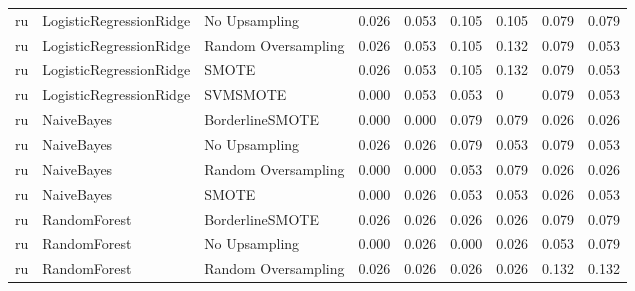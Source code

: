 \begin{tabular}{lllllllll}
      ru &      LogisticRegressionRidge &       No Upsampling & 0.026 &                     0.053 &                 0.105 &                  0.105 &                                   0.079 &     0.079 \\
      ru &      LogisticRegressionRidge & Random Oversampling & 0.026 &                     0.053 &                 0.105 &                  0.132 &                                   0.079 &     0.053 \\
      ru &      LogisticRegressionRidge &               SMOTE & 0.026 &                     0.053 &                 0.105 &                  0.132 &                                   0.079 &     0.053 \\
      ru &      LogisticRegressionRidge &            SVMSMOTE & 0.000 &                     0.053 &                 0.053 &                      0 &                                   0.079 &     0.053 \\
      ru &                   NaiveBayes &     BorderlineSMOTE & 0.000 &                     0.000 &                 0.079 &                  0.079 &                                   0.026 &     0.026 \\
      ru &                   NaiveBayes &       No Upsampling & 0.026 &                     0.026 &                 0.079 &                  0.053 &                                   0.079 &     0.053 \\
      ru &                   NaiveBayes & Random Oversampling & 0.000 &                     0.000 &                 0.053 &                  0.079 &                                   0.026 &     0.026 \\
      ru &                   NaiveBayes &               SMOTE & 0.000 &                     0.026 &                 0.053 &                  0.053 &                                   0.026 &     0.053 \\
      ru &                 RandomForest &     BorderlineSMOTE & 0.026 &                     0.026 &                 0.026 &                  0.026 &                                   0.079 &     0.079 \\
      ru &                 RandomForest &       No Upsampling & 0.000 &                     0.026 &                 0.000 &                  0.026 &                                   0.053 &     0.079 \\
      ru &                 RandomForest & Random Oversampling & 0.026 &                     0.026 &                 0.026 &                  0.026 &                                   0.132 &     0.132 \\

\end{tabular}
